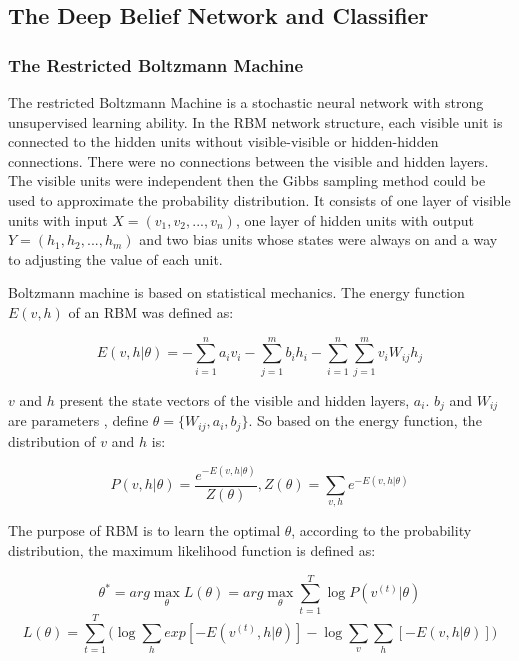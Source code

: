 \documentclass[graybox]{svmult}
\begin{document}
\subsection{The Deep Belief Network and Classifier}

\subsubsection{The Restricted Boltzmann Machine}
The restricted Boltzmann Machine is a stochastic neural network with strong unsupervised learning ability. In the RBM network structure, each visible unit is connected to the hidden units without visible-visible or hidden-hidden connections. There were no connections between the visible and hidden layers.  The visible units were independent then the Gibbs sampling method could be used to approximate the probability distribution. It consists of one layer of visible units with input $X = (v_1, v_2,...,v_n)$, one layer of hidden units with output $Y=(h_1, h_2,...,h_m)$ and two bias units whose states were always on and a way to adjusting the value of each unit.

Boltzmann machine is based on statistical mechanics. The energy function $E(v, h)$ of an RBM was defined as:

\begin{equation}
E(v,h|\theta) = -\sum_{i=1}^n{a_iv_i}-\sum_{j=1}^m{b_ih_i}-\sum_{i=1}^n\sum_{j=1}^m{v_iW_{ij}h_j}
\end{equation}


$v$ and $h$ present the state vectors of the visible and hidden layers, $a_i$. $b_j$ and $W_{ij}$ are parameters , define $\theta = \{W_{ij}, a_i, b_j\}$. So based on the energy function, the distribution of $v$ and $h$ is:


\begin{equation}
P(v,h|\theta) = \frac{e^{-E(v,h|\theta)}}{Z(\theta)}, Z(\theta) = \sum_{v,h}^{}{e^{-E(v,h|\theta)}}
\end{equation}


The purpose of RBM is to learn the optimal $\theta$, according to the probability distribution, the maximum likelihood function is defined as:

\begin{equation}
\theta^* = arg\max\limits_{\theta}L(\theta) = arg\max\limits_{\theta}\sum_{t=1}^T{\log P(v^{(t)}|\theta)}
\end{equation}
\begin{equation}
L(\theta) = \sum_{t=1}^T\Bigg (\log\sum_{h}^{}{exp[-E(v^{(t)},h|\theta)]}-\log\sum_{v}^{}{\sum_{h}^{}{[-E(v,h|\theta)]}}\Bigg)
\end{equation}
\end{document}
